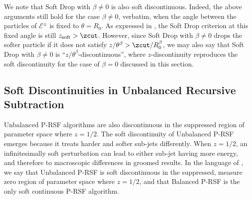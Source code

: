 We note that Soft Drop with \(\beta \neq 0\) is also soft discontinuous.
%
Indeed, the above arguments still hold for the case \(\beta \neq 0\), verbatim, when the angle between the particles of \(\mathcal E^\pm\) is fixed to \(\theta = R_0\).
%
As expressed in , the Soft Drop criterion at this fixed angle is still \(z_{\rm soft} > \zcut\).
%
However, since Soft Drop with \(\beta \neq 0\) drops the softer particle if it does not satisfy \(z / \theta^{\beta} > \zcut/ R_0^\beta\), we may also say that Soft Drop with \(\beta \neq 0\) is ``\(z / \theta^{\beta}\)-discontinuous'', where \(z\)-discontinuity reproduces the soft discontinuity for the case of \(\beta = 0\) discussed in this section.




\subsection{Soft Discontinuities in Unbalanced Recursive Subtraction}
\label{sec:rsf_discont}

Unbalanced P-RSF algorithms are also discontinuous in the suppressed region of parameter space where \(z = 1/2\).
%
The soft discontinuity of Unbalanced P-RSF emerges because it treats harder and softer sub-jets differently.
%
When \(z = 1/2\), an infinitesimally soft perturbation can lead to either sub-jet having more energy, and therefore to macroscopic differences in groomed results.
%
In the language of , we say that Unbalanced P-RSF is soft discontinuous in the suppressed, measure zero region of parameter space where \(z = 1/2\), and that Balanced P-RSF is the only soft continuous P-RSF algorithm.

